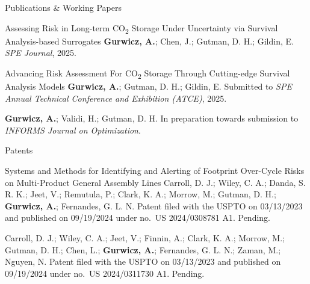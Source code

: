 \begin{cvcontentsection}{Publications \& Working Papers}

\cvpublication
    {Assessing Risk in Long-term CO\textsubscript{2} Storage Under Uncertainty via Survival Analysis-based Surrogates}
    {\textbf{Gurwicz, A.}; Chen, J.; Gutman, D. H.; Gildin, E.}
    {\textit{SPE Journal}, 2025.
    }

\cvpublication
    {Advancing Risk Assessment For CO\textsubscript{2} Storage Through Cutting-edge Survival Analysis Models}
    {\textbf{Gurwicz, A.}; Gutman, D. H.; Gildin, E.}
    {Submitted to \textit{SPE Annual Technical Conference and Exhibition (ATCE)}, 2025.}

    {\textbf{Gurwicz, A.}; Validi, H.; Gutman, D. H.}
    {In preparation towards submission to \textit{INFORMS Journal on Optimization}.}

\end{cvcontentsection}

\begin{cvcontentsection}{Patents}

\cvpublication
    {Systems and Methods for Identifying and Alerting of Footprint Over-Cycle Risks on Multi-Product General Assembly
    Lines}
    {Carroll, D. J.; Wiley, C. A.; Danda, S. R. K.; Jeet, V.; Remutula, P.; Clark, K. A.; Morrow, M.; Gutman, D. H.;
    \textbf{Gurwicz, A.}; Fernandes, G. L. N.}
    {Patent filed with the USPTO on 03/13/2023 and published on 09/19/2024 under no.\ US 2024/0308781 A1. Pending.}

    {Carroll, D. J.; Wiley, C. A.; Jeet, V.; Finnin, A.; Clark, K. A.; Morrow, M.; Gutman, D. H.; Chen, L.;
    \textbf{Gurwicz, A.}; Fernandes, G. L. N.; Zaman, M.; Nguyen, N.}
    {Patent filed with the USPTO on 03/13/2023 and published on 09/19/2024 under no.\ US 2024/0311730 A1. Pending.}

\end{cvcontentsection}

